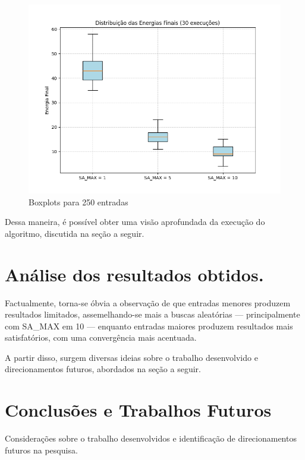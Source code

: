 \documentclass[12pt]{article}
\begin{document}
\begin{figure}[H]
  \centering
  \includegraphics[width=.9\textwidth]{../../boxplot_250.png}
  \caption{Boxplots para 250 entradas}
  \label{fig:metodologia}
  \end{figure}

Dessa maneira, é possível obter uma visão aprofundada da execução do algoritmo, discutida na seção a seguir.

\section{Análise dos resultados obtidos.}
\label{sec:analise_dos_resultados_obtidos}

Factualmente, torna-se óbvia a observação de que entradas menores produzem resultados limitados, assemelhando-se mais a buscas aleatórias --- principalmente com SA\_MAX em 10 --- enquanto entradas maiores produzem resultados mais satisfatórios, com uma convergência mais acentuada.


A partir disso, surgem diversas ideias sobre o trabalho desenvolvido e direcionamentos futuros, abordados na seção a seguir.

\section{Conclusões e Trabalhos Futuros}
\label{sec:conclusoes_e_trabalhos_futuros}


Considerações sobre o trabalho desenvolvidos e identificação de direcionamentos futuros na
pesquisa.





\end{document}

